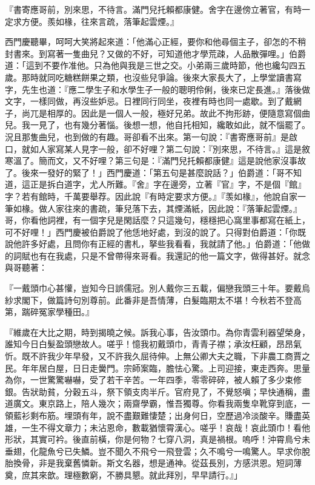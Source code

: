 \begin{showcontents}{}
『書寄應哥前，別來思，不待言。滿門兒托賴都康健。舍字在邊傍立著官，有時一定求方便。羨如椽，往來言疏，落筆起雲煙。』

西門慶聽畢，呵呵大笑將起來道：「他滿心正經，要你和他尋個主子，卻怎的不稍封書來。到寫著一隻曲兒？又做的不好，可知道他才學荒疎，人品散彈哩。」伯爵道：「這到不要作准他。只為他與我是三世之交。小弟兩三歲時節，他也纔勾四五歲。那時就同吃糖糕餅果之類，也沒些兒爭論。後來大家長大了，上學堂讀書寫字，先生也道：『應二學生子和水學生子一般的聰明伶俐，後來已定長進。』落後做文字，一樣同做，再沒些妒忌。日裡同行同坐，夜裡有時也同一處歇。到了戴網子，尚兀是相厚的。因此是一個人一般，極好兄弟。故此不拘形跡，便隨意寫個曲兒。我一見了，也有幾分著惱。後想一想，他自托相知，纔敢如此，就不惱罷了。況且那隻曲兒，也到做的有趣。哥卻看不出來。第一句說：『書寄應哥前』是啟口，就如人家寫某人見字一般，卻不好哩？第二句說：『別來思，不待言。』這是敘寒溫了。簡而文，又不好哩？第三句是：『滿門兒托賴都康健』這是說他家沒事故了。後來一發好的緊了！」西門慶道：「第五句是甚麼說話？」伯爵道：「哥不知道，這正是拆白道字，尤人所難。『舍』字在邊旁，立著『官』字，不是個『館』字？若有館時，千萬要舉荐。因此說『有時定要求方便。』『羡如椽』，他說自家一筆如椽。做人家往來的書疏，筆兒落下去，其煙滿紙，因此說：『落筆起雲煙。』哥，你看他詞裡，有一個字兒是閑話麼？只這幾句，穩穩把心窩里事都寫在紙上，可不好哩！」西門慶被伯爵說了他恁地好處，到沒的說了。只得對伯爵道：「你既說他許多好處，且問你有正經的書札，拏些我看看，我就請了他。」伯爵道：「他做的詞賦也有在我處，只是不曾帶得來哥看。我還記的他一篇文字，做得甚好。就念與哥聽著：

『一戴頭巾心甚懽，豈知今日誤儒冠。別人戴你三五載，偏戀我頭三十年。要戴烏紗求閣下，做篇詩句別尊前。此番非是吾情薄，白髮臨期太不堪！今秋若不登高第，踹碎冤家學種田。』

『維歲在大比之期，時到揭曉之候。訴我心事，告汝頭巾。為你青雲利器望榮身，誰知今日白髮盈頭戀故人。嗟乎！憶我初戴頭巾，青青子襟；承汝枉顧，昂昂氣忻。既不許我少年早發，又不許我久屈待伸。上無公卿大夫之職，下非農工商賈之民。年年居白屋，日日走黌門。宗師案臨，膽怯心驚。上司迎接，東走西奔。思量為你，一世驚驚嚇嚇，受了若干辛苦。一年四季，零零碎碎，被人賴了多少束修銀。告狀助貧，分穀五斗，祭下領支肉半斤。官府見了，不覺怒嗔；早快通稱，盡道廣文。東京路上，陪人幾次；兩齋學霸，惟吾獨尊。你看我兩隻皁靴穿到底，一領藍衫剩布筋。埋頭有年，說不盡艱難悽楚；出身何日，空歷過冷淡酸辛。賺盡英雄，一生不得文章力；未沾恩命，數載猶懷霄漢心。嗟乎！哀哉！哀此頭巾！看他形狀，其實可衿。後直前橫，你是何物？七穿八洞，真是禍根。嗚呼！沖霄鳥兮未垂翅，化龍魚兮已失鱗。豈不聞久不飛兮一飛登雲；久不鳴兮一鳴驚人。早求你脫胎換骨，非是我棄舊憐新。斯文名器，想是通神。從茲長別，方感洪恩。短詞薄奠，庶其來歆。理極數窮，不勝具懇。就此拜別，早早請行。』」


\end{showcontents}
